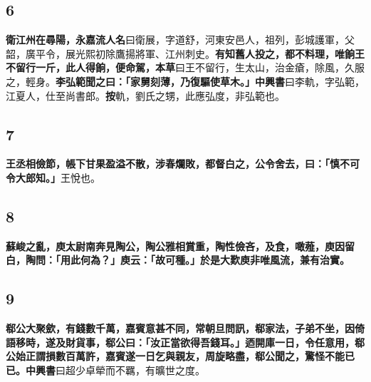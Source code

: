 \subsection*{6}

\textbf{衛江州在尋陽，}{\footnotesize \textbf{永嘉流人名}曰衛展，字道舒，河東安邑人，祖列，彭城護軍，父韶，廣平令，展光熙初除鷹揚將軍、江州刺史。}\textbf{有知舊人投之，都不料理，唯餉王不留行一斤，此人得餉，便命駕，}{\footnotesize \textbf{本草}曰王不留行，生太山，治金瘡，除風，久服之，輕身。}\textbf{李弘範聞之曰：「家舅刻薄，乃復驅使草木。」}{\footnotesize \textbf{中興書}曰李軌，字弘範，江夏人，仕至尚書郎。\textbf{按}軌，劉氏之甥，此應弘度，非弘範也。}

\subsection*{7}

\textbf{王丞相儉節，帳下甘果盈溢不散，涉春爛敗，都督白之，公令舍去，曰：「慎不可令大郎知。」}{\footnotesize 王悅也。}

\subsection*{8}

\textbf{蘇峻之亂，庾太尉南奔見陶公，陶公雅相賞重，陶性儉吝，及食，噉薤，庾因留白，陶問：「用此何為？」庾云：「故可種。」於是大歎庾非唯風流，兼有治實。}

\subsection*{9}

\textbf{郗公大聚歛，有錢數千萬，嘉賓意甚不同，常朝旦問訊，郗家法，子弟不坐，因倚語移時，遂及財貨事，郗公曰：「汝正當欲得吾錢耳。」迺開庫一日，令任意用，郗公始正謂損數百萬許，嘉賓遂一日乞與親友，周旋略盡，郗公聞之，驚怪不能已已。}{\footnotesize \textbf{中興書}曰超少卓犖而不羈，有曠世之度。}